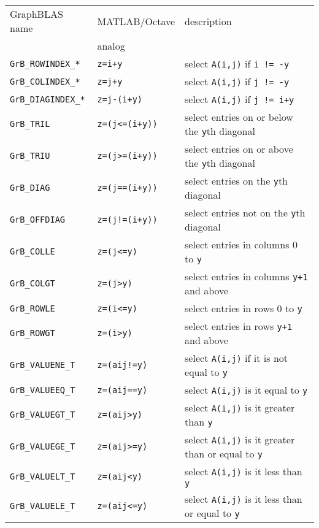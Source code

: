 \documentclass[12pt]{article}
\begin{document}
\vspace{0.2in}
\noindent
{\footnotesize
\begin{tabular}{lll}
\hline
GraphBLAS name          & MATLAB/Octave     & description \\
                        & analog            & \\
\hline
\verb'GrB_ROWINDEX_*'    & \verb'z=i+y'         & select \verb'A(i,j)' if \verb'i != -y' \\
\verb'GrB_COLINDEX_*'    & \verb'z=j+y'         & select \verb'A(i,j)' if \verb'j != -y' \\
\verb'GrB_DIAGINDEX_*'   & \verb'z=j-(i+y)'     & select \verb'A(i,j)' if \verb'j != i+y' \\
\hline
\verb'GrB_TRIL'    & \verb'z=(j<=(i+y))'  & select entries on or below the \verb'y'th diagonal \\
\verb'GrB_TRIU'    & \verb'z=(j>=(i+y))'  & select entries on or above the \verb'y'th diagonal \\
\verb'GrB_DIAG'    & \verb'z=(j==(i+y))'  & select entries on the \verb'y'th diagonal \\
\verb'GrB_OFFDIAG' & \verb'z=(j!=(i+y))'  & select entries not on the \verb'y'th diagonal \\
\verb'GrB_COLLE'   & \verb'z=(j<=y)'      & select entries in columns 0 to \verb'y' \\
\verb'GrB_COLGT'   & \verb'z=(j>y)'       & select entries in columns \verb'y+1' and above \\
\verb'GrB_ROWLE'   & \verb'z=(i<=y)'      & select entries in rows 0 to \verb'y' \\
\verb'GrB_ROWGT'   & \verb'z=(i>y)'       & select entries in rows \verb'y+1' and above \\
\hline
\verb'GrB_VALUENE_T'     & \verb'z=(aij!=y)'    & select \verb'A(i,j)' if it is not equal to \verb'y'\\
\verb'GrB_VALUEEQ_T'     & \verb'z=(aij==y)'    & select \verb'A(i,j)' is it equal to \verb'y'\\
\verb'GrB_VALUEGT_T'     & \verb'z=(aij>y)'     & select \verb'A(i,j)' is it greater than \verb'y' \\
\verb'GrB_VALUEGE_T'     & \verb'z=(aij>=y)'    & select \verb'A(i,j)' is it greater than or equal to \verb'y' \\
\verb'GrB_VALUELT_T'     & \verb'z=(aij<y)'     & select \verb'A(i,j)' is it less than \verb'y' \\
\verb'GrB_VALUELE_T'     & \verb'z=(aij<=y)'    & select \verb'A(i,j)' is it less than or equal to \verb'y' \\
%
\hline
\end{tabular}
}
\vspace{0.2in}
\end{document}
